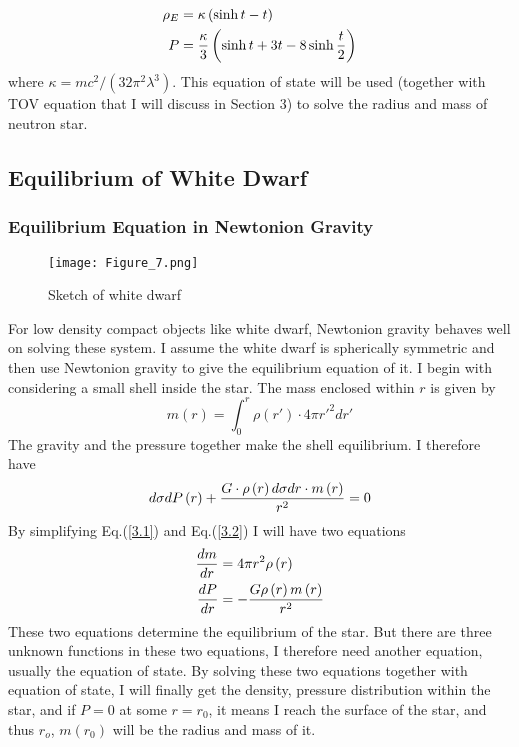 \documentclass[preprint]{revtex4-1}
\begin{document}
\begin{align}
{\rho _E} &= \kappa \left( {\sinh t - t} \right)\nonumber \\
P &= {\kappa  \over 3}\left( {\sinh t + 3t - 8\sinh {t \over 2}} \right) \label{2.5}
\end{align}
where $\kappa  = m{c^2}/\left( {32{\pi ^2}{\lambda ^3}} \right)$. This equation of state will be used (together with TOV equation that I will discuss in Section 3) to solve the radius and mass of neutron star. 

\subsection{Equilibrium of White Dwarf}
\subsubsection{Equilibrium Equation in Newtonion Gravity}
\begin{figure}
	\centering   
	\texttt{[image: Figure\_7.png]}  
	\caption{Sketch of white dwarf} 
	\label{fig:7} 
\end{figure}
For low density compact objects like white dwarf, Newtonion gravity behaves well on solving these system. I assume the white dwarf is spherically symmetric and then use Newtonion gravity to give the equilibrium equation of it. I begin with considering a small shell inside the star. The mass enclosed within $r$ is given by
\begin{equation}
m\left( r \right) = \int_0^r {\rho \left( {r'} \right) \cdot 4\pi r{'^2}} dr' \label{3.1}
\end{equation}
The gravity and the pressure together make the shell equilibrium. I therefore have
\begin{equation}
d\sigma dP\left( r \right) + {{G \cdot \rho \left( r \right)d\sigma dr \cdot m\left( r \right)} \over {{r^2}}} = 0 \label{3.2}
\end{equation}
By simplifying Eq.(\ref{3.1}) and Eq.(\ref{3.2}) I will have two equations
\begin{align}
{{dm} \over {dr}} &= 4\pi {r^2}\rho \left( r \right) \label{3.3}\\
{{dP} \over {dr}} &=  - {{G\rho \left( r \right)m\left( r \right)} \over {{r^2}}} \label{3.4}
\end{align}
These two equations determine the equilibrium of the star. But there are three unknown functions in these two equations, I therefore need another equation, usually the equation of state. By solving these two equations together with equation of state, I will finally get the density, pressure distribution within the star, and if $P=0$ at some $r=r_0$, it means I reach the surface of the star, and thus $r_o$, $m(r_0)$ will be the radius and mass of it. 
\end{document}

